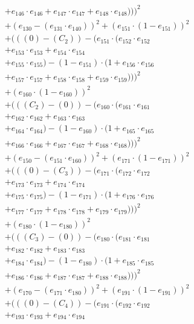 \documentclass[10pt, a4paper]{article}
\begin{document}
\begin{align*}
& + e_{146} \cdot e_{146} + e_{147} \cdot e_{147} + e_{148} \cdot e_{148})))^{2} \\
& + (e_{130} - (e_{131} \cdot e_{140}))^{2} + (e_{151} \cdot (1 - e_{151}))^{2} \\
& + (((0) - (C_{2})) - (e_{151} \cdot (e_{152} \cdot e_{152} \\
& + e_{153} \cdot e_{153} + e_{154} \cdot e_{154} \\
& + e_{155} \cdot e_{155}) - (1 - e_{151}) \cdot (1 + e_{156} \cdot e_{156} \\
& + e_{157} \cdot e_{157} + e_{158} \cdot e_{158} + e_{159} \cdot e_{159})))^{2} \\
& + (e_{160} \cdot (1 - e_{160}))^{2} \\
& + (((C_{2}) - (0)) - (e_{160} \cdot (e_{161} \cdot e_{161} \\
& + e_{162} \cdot e_{162} + e_{163} \cdot e_{163} \\
& + e_{164} \cdot e_{164}) - (1 - e_{160}) \cdot (1 + e_{165} \cdot e_{165} \\
& + e_{166} \cdot e_{166} + e_{167} \cdot e_{167} + e_{168} \cdot e_{168})))^{2} \\
& + (e_{150} - (e_{151} \cdot e_{160}))^{2} + (e_{171} \cdot (1 - e_{171}))^{2} \\
& + (((0) - (C_{3})) - (e_{171} \cdot (e_{172} \cdot e_{172} \\
& + e_{173} \cdot e_{173} + e_{174} \cdot e_{174} \\
& + e_{175} \cdot e_{175}) - (1 - e_{171}) \cdot (1 + e_{176} \cdot e_{176} \\
& + e_{177} \cdot e_{177} + e_{178} \cdot e_{178} + e_{179} \cdot e_{179})))^{2} \\
& + (e_{180} \cdot (1 - e_{180}))^{2} \\
& + (((C_{3}) - (0)) - (e_{180} \cdot (e_{181} \cdot e_{181} \\
& + e_{182} \cdot e_{182} + e_{183} \cdot e_{183} \\
& + e_{184} \cdot e_{184}) - (1 - e_{180}) \cdot (1 + e_{185} \cdot e_{185} \\
& + e_{186} \cdot e_{186} + e_{187} \cdot e_{187} + e_{188} \cdot e_{188})))^{2} \\
& + (e_{170} - (e_{171} \cdot e_{180}))^{2} + (e_{191} \cdot (1 - e_{191}))^{2} \\
& + (((0) - (C_{4})) - (e_{191} \cdot (e_{192} \cdot e_{192} \\
& + e_{193} \cdot e_{193} + e_{194} \cdot e_{194} \\

\end{align*}
\end{document}
